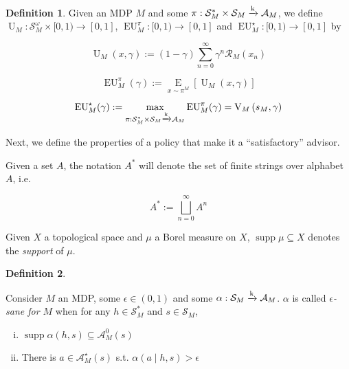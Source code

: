 \documentclass[11pt]{article}
\theoremstyle{definition}
\newtheorem{definition}{Definition}%
\theoremstyle{plain}
\DeclareMathOperator{\Supp}{supp}
\newcommand{\AP}[1]{\left(#1\right)}
\newcommand{\AB}[1]{\left[#1\right]}
\newcommand{\Ea}[2]{\underset{#1}{\operatorname{E}}\AB{#2}}
\newcommand{\K}{\xrightarrow{\textnormal{k}}}
\newcommand{\A}{\mathcal{A}}
\newcommand{\St}{\mathcal{S}}
\newcommand{\R}{\mathcal{R}}
\newcommand{\Ut}{\operatorname{U}}
\newcommand{\V}{\operatorname{V}}
\newcommand{\EU}{\operatorname{EU}}
\newcommand{\Ad}{\alpha}
\begin{document}
\begin{samepage}
\begin{definition}

Given an MDP $M$ and some $\pi: \St_M^* \times \St_M \K \A_M$, we define $\Ut_M: \St_M^\omega \times [0,1) \rightarrow [0,1]$, $\EU_M^\pi: [0,1) \rightarrow [0,1]$ and $\EU_M^\star: [0,1) \rightarrow [0,1]$ by

\begin{equation}
\Ut_M(x,\gamma) := (1-\gamma)\sum_{n=0}^\infty {\gamma^n \R_M\AP{x_n}}
\end{equation}

\begin{equation}
\EU_M^\pi(\gamma) := \Ea{x\sim\pi^M}{\Ut_M(x,\gamma)}
\end{equation}

\begin{equation}
\EU_M^\star(\gamma):=\max_{\pi: \St_M^* \times \St_M \K \A_M} {\EU_M^\pi(\gamma)} = \V_M\AP{s_M,\gamma}
\end{equation}

\end{definition}
\end{samepage}

Next, we define the properties of a policy that make it a \enquote{satisfactory} advisor.

Given a set $A$, the notation $A^*$ will denote the set of finite strings over alphabet $A$, i.e.

\[A^* := \bigsqcup_{n = 0}^\infty A^n\]

Given $X$ a topological space and $\mu$ a Borel measure on $X$, $\Supp{\mu} \subseteq X$ denotes the \emph{support} of $\mu$.

\begin{samepage}
\begin{definition}
\label{def:sane}

Consider $M$ an MDP, some $\epsilon\in(0,1)$ and some $\Ad: \St_M \K \A_M$. $\Ad$ is called \emph{$\epsilon$-sane for $M$} when for any $h \in \St_M^*$ and $s \in \St_M$,

\begin{enumerate}[i.]
\item\label{con:def__sane__safe} $\Supp{\Ad(h,s)} \subseteq \A_M^0\AP{s}$
\item\label{con:def__sane__bold} There is $a \in \A_M^\star(s)$ s.t. $\Ad(a \mid h,s) > \epsilon$
\end{enumerate}

\end{definition}
\end{samepage}
\end{document}
